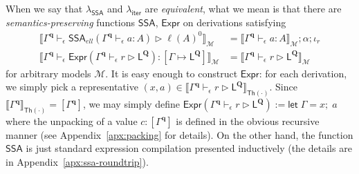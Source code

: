 \documentclass[acmsmall,screen,anonymous,review]{acmart}
\newcommand{\mc}[1]{\ensuremath{\mathcal{#1}}}
\newcommand{\mb}[1]{\ensuremath{\mathbf{#1}}}
\newcommand{\ms}[1]{\ensuremath{\mathsf{#1}}}
\newcommand{\letexpr}[3]{\ensuremath{\ms{let}\;#1 = #2;\;#3}}
\newcommand{\hasty}[4]{#1 \vdash_{#2} #3: {#4}}
\newcommand{\haslb}[4]{#1 \vdash_{#2} #3 \rhd #4}
\newcommand{\tossa}[2]{\ms{SSA}_{#1}(#2)}
\newcommand{\etoty}[1]{[#1]}
\newcommand{\ltoty}[2]{[#1 \mapsto #2]}
\newcommand{\dnt}[1]{\llbracket{#1}\rrbracket}
\newcommand{\subiterexp}{\texorpdfstring{\(\lambda_{\ms{iter}}\)}{lambda-iter}}
\newcommand{\isotopessa}{\(\lambda_{\ms{SSA}}\)}
\begin{document}
When we say that \isotopessa{} and \subiterexp{} are \emph{equivalent}, what we mean is that there
are \emph{semantics-preserving} functions $\ms{SSA}$, $\ms{Expr}$ on derivations satisfying
\begin{align*}
\dnt{
  \haslb{\Gamma^{\mb{q}}}{\epsilon}{\tossa{ell}{\hasty{\Gamma^{\mb{q}}}{\epsilon}{a}{A}}}
  {\ell(A)^0}
}_{\mc{M}} &= \dnt{\hasty{\Gamma^{\mb{q}}}{\epsilon}{a}{A}}_{\mc{M}} ; \alpha ; \iota_r \\
\dnt{
  \hasty{\Gamma^{\mb{q}}}{\epsilon}
    {\ms{Expr}(\haslb{\Gamma^{\mb{q}}}{\epsilon}{r}{\ms{L}^{\mb{Q}}})}
    {\ltoty{\Gamma}{\ms{L}^{\mb{Q}}}}
}_{\mc{M}} &= \dnt{\haslb{\Gamma^{\mb{q}}}{\epsilon}{r}{\ms{L}^{\mb{Q}}}}_{\mc{M}}
\end{align*}
for arbitrary models $\mc{M}$. 
%
%
It is easy enough to construct $\ms{Expr}$: for each derivation,
we simply pick a representative 
$
  (x, a) \in 
  \dnt{\haslb{\Gamma^{\mb{q}}}{\epsilon}{r}{\ms{L}^{\mb{Q}}}}_{\ms{Th(\cdot)}}
$. Since $\dnt{\Gamma^{\mb{q}}}_{\ms{Th}(\cdot)} = \etoty{\Gamma^{\mb{q}}}$, we may simply define
$
\ms{Expr}(\haslb{\Gamma^{\mb{q}}}{\epsilon}{r}{\ms{L}^{\mb{Q}}}) := 
  \letexpr{\Gamma}{x}{a}
$
where the unpacking of a value $c : \etoty{\Gamma^{\mb{q}}}$ is defined in the obvious recursive
manner (see Appendix~\ref{apx:packing} for details). 
%
%
On the other hand, the function $\ms{SSA}$ is just standard expression compilation presented
inductively (the details are in Appendix~\ref{apx:ssa-roundtrip}). 
\end{document}
